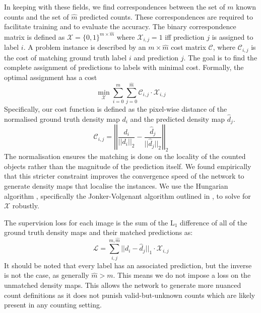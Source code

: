 \documentclass[../thesis.tex]{subfiles}
\begin{document}
In keeping with these fields, we find correspondences between the set of $m$ known counts and the set of $\hat{m}$ predicted counts.
These correspondences are required to facilitate training and to evaluate the accuracy.
The binary correspondence matrix is defined as $\mathcal{X} = \{0,1\}^{m\times\hat{m}}$ where  $\mathcal{X}_{i,j}=1$ iff prediction $j$ is assigned to label $i$.
A problem instance is described by an $m\times\hat{m}$ cost matrix $\mathcal{C}$, where $\mathcal{C}_{i,j}$ is the cost of matching ground truth label $i$ and prediction $j$. 
The goal is to find the complete assignment of predictions to labels with minimal cost.
Formally, the optimal assignment has a cost
\begin{equation}\label{eq__ABC123__Bipartite_matching}  \min_{\mathcal{X}}\sum_{i=0}^{m}\sum_{j=0}^{\hat{m}}\mathcal{C}_{i,j} \cdot \mathcal{X}_{i,j}
\end{equation}
Specifically, our cost function is defined as the pixel-wise distance of the normalised ground truth density map $d_i$ and the predicted density map $\hat{d}_j$. 
\begin{equation} \label{eq__ABC123__MAPE_cost}
\mathcal{C}_{i,j} = \left|\left| \frac{d_i}{||d_i||_2} -  \frac{\hat{d}_j}{||\hat{d}_j||_2} \right|\right|_2 
\end{equation}
The normalisation ensures the matching is done on the locality of the counted objects rather than the magnitude of the prediction itself. We found empirically that this stricter constraint improves the convergence speed of the network to generate density maps that localise the instances.
We use the Hungarian algorithm \cite{Kuhn1955}, specifically the Jonker-Volgenant algorithm outlined in \citet{Crouse2016hungarianmatching}, to solve for $\mathcal{X}$ robustly.

The supervision loss for each image is the sum of the L$_1$ difference of  all of the ground truth density maps and their matched predictions as:
\begin{equation} \label{eq__ABC123__total_loss}
\mathcal{L} = \sum_{i,j}^{m,\hat{m}}||d_i - \hat{d}_j||_1 \cdot \mathcal{X}_{i,j}
\end{equation}
It should be noted that every label has an associated prediction, but the inverse is not the case, as generally $\hat{m} > m$.
This means we do not impose a loss on the unmatched density maps.
This allows the network to generate more nuanced count definitions as it does not punish valid-but-unknown counts which are likely present in any counting setting.
\end{document}
